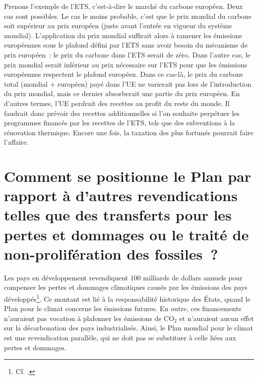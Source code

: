 \documentclass[a5paper,french,openany]{memoir}
\begin{document}
Prenons l'exemple de l'ETS, c'est-à-dire le marché du carbone européen. Deux cas sont possibles. Le cas le moins probable, c'est que le prix mondial du carbone soit supérieur au prix européen (juste avant l'entrée en vigueur du système mondial). L'application du prix mondial suffirait alors à ramener les émissions européennes sous le plafond défini par l'ETS sans avoir besoin du mécanisme de prix européen~: le prix du carbone dans l'ETS serait de zéro. Dans l'autre cas, le prix mondial serait inférieur au prix nécessaire sur l'ETS pour que les émissions européennes respectent le plafond européen. Dans ce cas-là, le prix du carbone total (mondial + européen) payé dans l'UE ne varierait pas lors de l'introduction du prix mondial, mais ce dernier absorberait une partie du prix européen. En d'autres termes, l'UE perdrait des recettes au profit du reste du monde. Il faudrait donc prévoir des recettes additionnelles si l'on souhaite perpétuer les programmes financés par les recettes de l'ETS, tels que des subventions à la rénovation thermique. Encore une fois, la taxation des plus fortunés pourrait faire l'affaire.

\section*{\normalsize Comment se positionne le Plan par rapport à d'autres revendications telles que des transferts pour les pertes et dommages ou le traité de non-prolifération des fossiles~?}\label{q:climate_movt}

Les pays en développement revendiquent 100 milliards de dollars annuels pour compenser les pertes et dommages climatiques causés par les émissions des pays développés\footnote{Cf. \cite{tc_proposal_2023}.}. Ce montant est lié à la responsabilité historique des États, quand le Plan pour le climat concerne les émissions futures. En outre, ces financements n'auraient pas vocation à plafonner les émissions de CO$_\text{2}$ et n'auraient aucun effet sur la décarbonation des pays industrialisés. Ainsi, le Plan mondial pour le climat est une revendication parallèle, qui ne doit pas se substituer à celle liées aux pertes et dommages.
\end{document}
